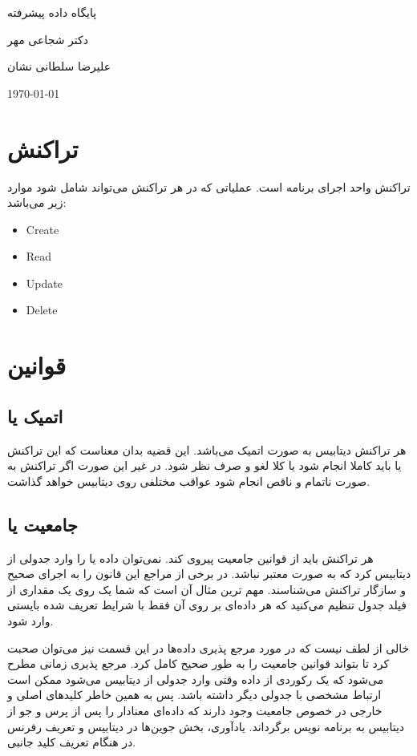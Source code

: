 \documentclass[a4paper]{article}
\begin{document}
\centerline{پایگاه داده پیشرفته}
\centerline{دکتر شجاعی مهر}
\centerline{علیرضا سلطانی نشان}
\centerline{\today}
\tableofcontents

\newpage

\section{تراکنش}

تراکنش واحد اجرای برنامه است. عملیاتی که در هر تراکنش می‌تواند شامل شود موارد
زیر می‌باشد:

\begin{itemize}
    \item Create
    \item Read
    \item Update
    \item Delete
\end{itemize}

\section{قوانین }

\subsection{اتمیک یا }

هر تراکنش دیتابیس به صورت اتمیک می‌باشد. این قضیه بدان معناست که این تراکنش یا
باید کاملا انجام شود یا کلا لغو و صرف نظر شود. در غیر این صورت اگر تراکنش به
صورت ناتمام و ناقص انجام شود عواقب مختلفی روی دیتابیس خواهد گذاشت.

\subsection{جامعیت یا }

هر تراکنش باید از قوانین جامعیت پیروی کند. نمی‌توان داده یا را وارد جدولی از
دیتابیس کرد که به صورت معتبر نباشد. در برخی از مراجع این قانون را به اجرای صحیح
و سازگار تراکنش می‌شناسند. مهم ترین مثال آن است که شما یک  روی یک
مقداری از فیلد جدول تنظیم می‌کنید که هر داده‌ای بر روی آن فقط با شرایط تعریف شده
بایستی وارد شود.

خالی از لطف نیست که در مورد مرجع پذیری داده‌ها در این قسمت نیز می‌توان صحبت کرد
تا بتواند قوانین جامعیت را به طور صحیح کامل کرد. مرجع پذیری زمانی مطرح می‌شود که
یک رکوردی از داده وقتی وارد جدولی از دیتابیس می‌شود ممکن است ارتباط مشخصی با
جدولی دیگر داشته باشد. پس به همین خاطر کلید‌های اصلی و خارجی در خصوص جامعیت وجود
دارند که داده‌ای معنادار را پس از پرس و جو از دیتابیس به برنامه نویس برگرداند.
یادآوری، بخش جوین‌ها در دیتابیس و تعریف رفرنس در هنگام تعریف کلید جانبی.
\end{document}
